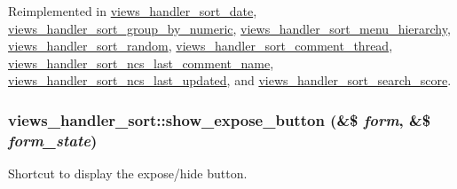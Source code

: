 Reimplemented in \hyperlink{classviews__handler__sort__date_a3d3680d96fee82a746bac50c051016a8}{views\_\-handler\_\-sort\_\-date}, \hyperlink{classviews__handler__sort__group__by__numeric_ada5ef20a050242560d9da35ef2202d87}{views\_\-handler\_\-sort\_\-group\_\-by\_\-numeric}, \hyperlink{classviews__handler__sort__menu__hierarchy_a04fd6337ac7ec486789586b65cf545fd}{views\_\-handler\_\-sort\_\-menu\_\-hierarchy}, \hyperlink{classviews__handler__sort__random_aeaf6fcc03c9d1a0f86a77b9e5314229a}{views\_\-handler\_\-sort\_\-random}, \hyperlink{classviews__handler__sort__comment__thread_a6ea2c9fdba530fd022c1eafd5b0c4cea}{views\_\-handler\_\-sort\_\-comment\_\-thread}, \hyperlink{classviews__handler__sort__ncs__last__comment__name_a23a0eb15347f118155df094a2cadd249}{views\_\-handler\_\-sort\_\-ncs\_\-last\_\-comment\_\-name}, \hyperlink{classviews__handler__sort__ncs__last__updated_a05d2ef9eb8727ee81915b34254d99355}{views\_\-handler\_\-sort\_\-ncs\_\-last\_\-updated}, and \hyperlink{classviews__handler__sort__search__score_a7d144db57e043dc594021228f8567726}{views\_\-handler\_\-sort\_\-search\_\-score}.\hypertarget{classviews__handler__sort_a1058d93ad14e1417c093a8716113be60}{
\subsubsection[{show\_\-expose\_\-button}]{\setlength{\rightskip}{0pt plus 5cm}views\_\-handler\_\-sort::show\_\-expose\_\-button (\&\$ {\em form}, \/  \&\$ {\em form\_\-state})}}
\label{classviews__handler__sort_a1058d93ad14e1417c093a8716113be60}
Shortcut to display the expose/hide button. 

